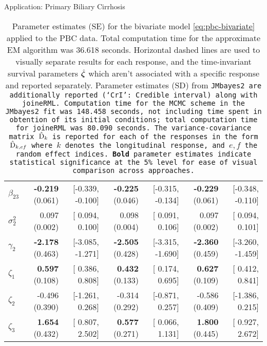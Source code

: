 \begin{chapter}{\label{cha:app-PBC}Application: Primary Biliary Cirrhosis}
\begin{table}[ht]
\begin{tabular}{lrrrrrr}
    $\beta_{23}$ & \textbf{-0.219} (0.061) & [-0.339, -0.100] & \textbf{-0.225} (0.046) & [-0.315, -0.134] & \textbf{-0.229} (0.061) & [-0.348, -0.110] \\ 
    $\sigma^2_2$ &  0.097 (0.002) & [ 0.094,  0.100] &  0.098 (0.004) & [ 0.091,  0.106] &  0.097 (0.002) & [ 0.094,  0.101] \\ 
    $\gamma_2$ & \textbf{-2.178} (0.463) & [-3.085, -1.271] & \textbf{-2.505} (0.428) & [-3.315, -1.690] & \textbf{-2.360} (0.459) & [-3.260, -1.459] \\ 
    \hdashline
    $\zeta_1$ &  \textbf{0.597} (0.108) & [ 0.386, 0.808] &  \textbf{0.432} (0.133) & [ 0.174, 0.695] &  \textbf{0.627} (0.109) & [ 0.412, 0.841] \\ 
    $\zeta_2$ & -0.496 (0.390) & [-1.261, 0.268] & -0.314 (0.292) & [-0.871, 0.257] & -0.586 (0.409) & [-1.386, 0.215] \\ 
    $\zeta_3$ &  \textbf{1.654} (0.432) & [ 0.807, 2.502] & \textbf{ 0.577} (0.271) & [ 0.066, 1.131] &  \textbf{1.800} (0.445) & [ 0.927, 2.672] \\ 
    \hline
  \end{tabular}
  \endgroup
  \caption{Parameter estimates (SE) for the bivariate model \eqref{eq:pbc-bivariate} applied to the PBC data. Total computation time for the approximate EM algorithm was 36.618 seconds. Horizontal dashed lines are used to visually separate results for each response, and the time-invariant survival parameters $\hat{\bm{\zeta}}$ which aren't associated with a specific response and reported separately. Parameter estimates (SD) from \tt{JMbayes2} are additionally reported (`CrI': Credible interval) along with \tt{joineRML}. Computation time for the MCMC scheme in the \tt{JMbayes2} fit was 148.458 seconds, not including time spent in obtention of its initial conditions; total computation time for \tt{joineRML} was 80.090 seconds. The variance-covariance matrix $\hat{\mathrm{D}}_k$ is reported for each of the responses in the form $\hat{\mathrm{D}}_{k,ef}$ where $k$ denotes the longitudinal response, and $e,f$ the random effect indices. \textbf{Bold} parameter estimates indicate statistical significance at the 5\% level for ease of visual comparison across approaches.}
  \label{tab:pbc-bivmodel}
  \end{table}


\end{chapter}
